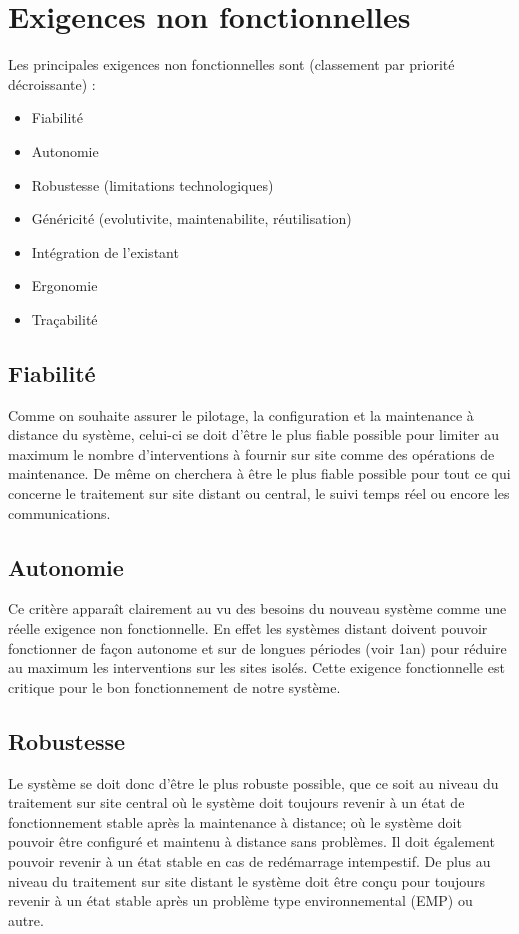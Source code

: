 \section{Exigences non fonctionnelles}

Les principales exigences non fonctionnelles sont (classement par priorité décroissante) : 

\begin{itemize}
       \item Fiabilité
       \item Autonomie
       \item Robustesse (limitations technologiques)
       \item Généricité (evolutivite, maintenabilite, réutilisation)
       \item Intégration de l'existant
       \item Ergonomie
       \item Traçabilité
\end{itemize}

\subsection{Fiabilité}
Comme on souhaite assurer le pilotage, la configuration et la maintenance à distance du système, celui-ci se doit d’être le plus fiable possible pour limiter au maximum le nombre d’interventions à fournir sur site comme des opérations de maintenance. De même on cherchera à être le plus fiable possible pour tout ce qui concerne le traitement sur site distant ou central, le suivi temps réel ou encore les communications.

\subsection{Autonomie}
	Ce critère apparaît clairement au vu des besoins du nouveau système comme une réelle exigence non fonctionnelle.
En effet les systèmes distant doivent pouvoir fonctionner de façon autonome et sur de longues périodes (voir 1an)
pour réduire au maximum les interventions sur les sites isolés. Cette exigence fonctionnelle est critique pour le bon
fonctionnement de notre système.

\subsection{Robustesse}
Le système se doit donc d’être le plus robuste possible, que ce soit au niveau du traitement sur site central où le système doit toujours revenir à un état de fonctionnement stable après la maintenance à distance; où le système doit pouvoir être configuré et maintenu à distance sans problèmes. Il doit également pouvoir revenir à un état stable en cas de redémarrage intempestif. De plus au niveau du traitement sur site distant le système doit être conçu pour toujours revenir à un état stable après un problème type environnemental (EMP) ou autre.

